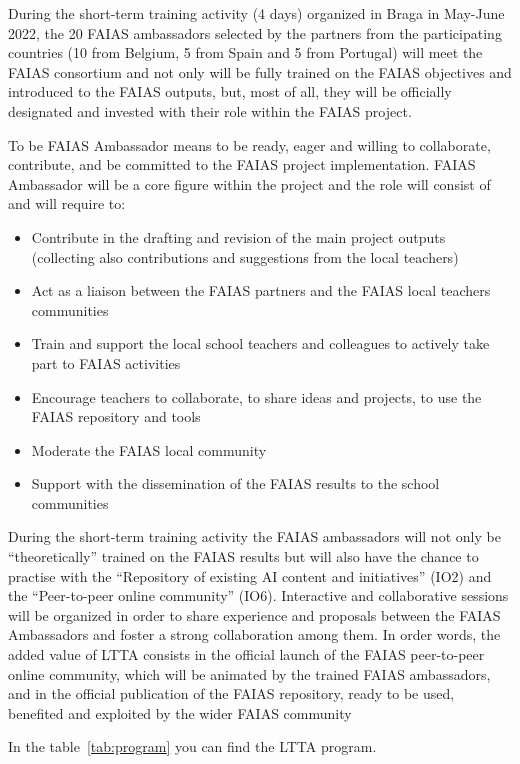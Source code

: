 \documentclass[11pt]{article}
\begin{document}
During the short-term training activity (4 days) organized in Braga in May-June 2022, the 20 FAIAS ambassadors selected by the partners from the participating countries (10 from Belgium, 5 from Spain and 5 from Portugal) will meet the FAIAS consortium and not only will be fully trained on the FAIAS objectives and introduced to the FAIAS outputs, but, most of all, they will be officially designated and invested with their role within the FAIAS project.

To be FAIAS Ambassador means to be ready, eager and willing to collaborate, contribute, and be committed to the FAIAS project implementation. FAIAS Ambassador will be a core figure within the project and the role will consist of and will require to:
\begin{itemize}
    \item Contribute in the drafting and revision of the main project outputs (collecting also contributions and suggestions from the local teachers)
    \item Act as a liaison between the FAIAS partners and the FAIAS local teachers communities 
    \item Train and support the local school teachers and colleagues to actively take part to FAIAS activities
    \item Encourage teachers to collaborate, to share ideas and projects, to use the FAIAS repository and tools 
    \item Moderate the FAIAS local community 
    \item Support with the dissemination of the FAIAS results to the school communities
\end{itemize}

During the short-term training activity the FAIAS ambassadors will not only be “theoretically” trained on the FAIAS results but will also have the chance to practise with the “Repository of existing AI content and initiatives” (IO2) and the “Peer-to-peer online community” (IO6). Interactive and collaborative sessions will be organized in order to share experience and proposals between the FAIAS Ambassadors and foster a strong collaboration among them.
In order words, the added value of LTTA consists in the official launch of the FAIAS peer-to-peer online community, which will be animated by the trained FAIAS ambassadors, and in the official publication of the FAIAS repository, ready to be used, benefited and exploited by the wider FAIAS community

In the table~\ref{tab:program} you can find the LTTA program.
\end{document}
